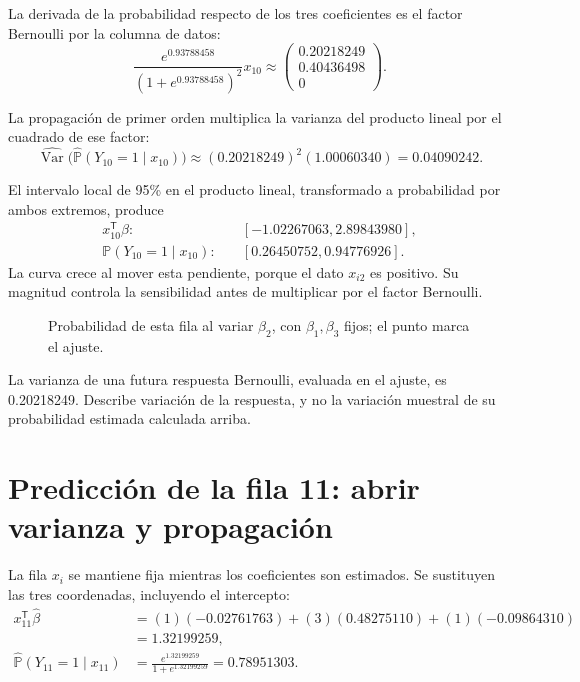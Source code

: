 \documentclass[11pt,a4paper]{article}
\newcommand{\Prob}{\mathbb P}
\newcommand{\T}{^{\mathsf T}}
\DeclareMathOperator{\Var}{Var}
\begin{document}
La derivada de la probabilidad respecto de los tres coeficientes
es el factor Bernoulli por la columna de datos:
\[
\frac{e^{0.93788458}}{(1+e^{0.93788458})^2}x_{10}\approx\begin{pmatrix}0.20218249\\0.40436498\\0\end{pmatrix}.
\]

La propagación de primer orden multiplica la varianza del
producto lineal por el cuadrado de ese factor:
\[
\widehat{\Var}\bigl(\widehat{\Prob}(Y_{10}=1\mid x_{10})\bigr)\approx(0.20218249)^2(1.00060340)=0.04090242.
\]

El intervalo local de 95\% en el producto lineal,
transformado a probabilidad por ambos extremos, produce
\[
\begin{aligned}
x_{10}\T\beta:&\quad[-1.02267063,2.89843980],\\\Prob(Y_{10}=1\mid x_{10}):&\quad[0.26450752,0.94776926].\end{aligned}
\]
La curva crece al mover esta pendiente, porque el dato $x_{i2}$ es positivo. Su magnitud controla la sensibilidad antes de multiplicar por el factor Bernoulli.
\begin{figure}[H]\centering
{}
\caption{Probabilidad de esta fila al variar \(\beta_2\), con \(\beta_1,\beta_3\) fijos; el punto marca el ajuste.}
\end{figure}

La varianza de una futura respuesta Bernoulli,
evaluada en el ajuste, es 0.20218249.
Describe variación de la respuesta, y no la variación
muestral de su probabilidad estimada calculada arriba.
\endgroup

\clearpage
\section{Predicción de la fila 11: abrir varianza y propagación}\label{logit120}
\begingroup\small
\setlength{\abovedisplayskip}{4pt}\setlength{\belowdisplayskip}{4pt}
La fila \(x_i\) se mantiene fija mientras los coeficientes
son estimados. Se sustituyen las tres coordenadas,
incluyendo el intercepto:
\[
\begin{aligned}
x_{11}\T\widehat\beta&=(1)(-0.02761763)+(3)(0.48275110)+(1)(-0.09864310)\\&=1.32199259,\\\widehat{\Prob}(Y_{11}=1\mid x_{11})&=\frac{e^{1.32199259}}{1+e^{1.32199259}}=0.78951303.\end{aligned}
\]
\end{document}

